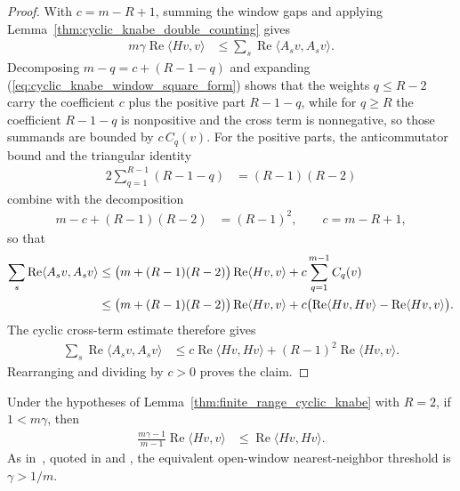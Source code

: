 \begin{proof}
    \leanok
    With $c=m-R+1$, summing the window gaps and applying
    Lemma~\ref{thm:cyclic_knabe_double_counting} gives
    \begin{align}
        m\gamma\operatorname{Re}\langle Hv,v\rangle
         & \leq\sum_s\operatorname{Re}\langle A_sv,A_sv\rangle.
    \end{align}
    Decomposing $m-q=c+(R-1-q)$ and expanding
    (\ref{eq:cyclic_knabe_window_square_form}) shows that the weights $q\leq R-2$
    carry the coefficient $c$ plus the positive part $R-1-q$, while for
    $q\geq R$ the coefficient $R-1-q$ is nonpositive and the cross term is
    nonnegative, so those summands are bounded by $c\,C_q(v)$. For the
    positive parts, the anticommutator bound and the triangular identity
    \begin{align}
        2\sum_{q=1}^{R-1}(R-1-q) & =(R-1)(R-2)
    \end{align}
    combine with the decomposition
    \begin{align}
        m-c+(R-1)(R-2) & =(R-1)^2,
        \qquad c=m-R+1,
        \label{eq:cyclic_knabe_coefficient}
    \end{align}
    so that
    \begin{align}
        \sum_s\operatorname{Re}\langle A_sv,A_sv\rangle
         & \leq\bigl(m+(R-1)(R-2)\bigr)\operatorname{Re}\langle Hv,v\rangle
        +c\sum_{q=1}^{m-1}C_q(v)
        \notag                                                              \\
         & \leq\bigl(m+(R-1)(R-2)\bigr)\operatorname{Re}\langle Hv,v\rangle
        +c\bigl(\operatorname{Re}\langle Hv,Hv\rangle
        -\operatorname{Re}\langle Hv,v\rangle\bigr).
        \notag
    \end{align}
    The cyclic cross-term estimate therefore gives
    \begin{align}
        \sum_s\operatorname{Re}\langle A_sv,A_sv\rangle
         & \leq c\operatorname{Re}\langle Hv,Hv\rangle
        +(R-1)^2\operatorname{Re}\langle Hv,v\rangle.
    \end{align}
    Rearranging and dividing by $c>0$ proves the claim.
\end{proof}

\begin{lemma}
    \label{thm:nearest_neighbor_cyclic_knabe}
    \leanok
    Under the hypotheses of Lemma~\ref{thm:finite_range_cyclic_knabe} with
    $R=2$, if $1<m\gamma$, then
    \begin{align}
        \frac{m\gamma-1}{m-1}\operatorname{Re}\langle Hv,v\rangle
         & \leq\operatorname{Re}\langle Hv,Hv\rangle.
    \end{align}
    As in~\cite{Knabe1988Energy}, quoted in
    \cite[lines~1483--1489]{PerezGarcia2007Matrix} and
    \cite[lines~2194--2197]{Cirac2021Matrix}, the equivalent open-window
    nearest-neighbor threshold is $\gamma>1/m$.
\end{lemma}

